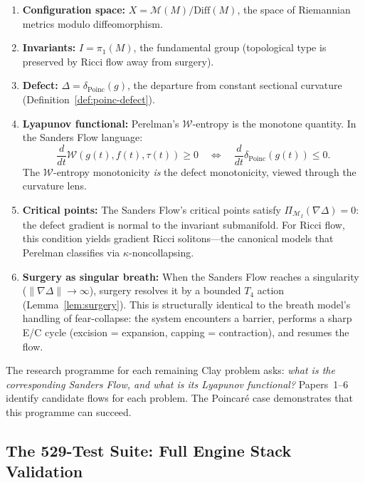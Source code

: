 \documentclass[11pt]{article}
\begin{document}
\begin{enumerate}
\item \textbf{Configuration space:} $X = \mathcal{M}(M)/\mathrm{Diff}(M)$,
the space of Riemannian metrics modulo diffeomorphism.

\item \textbf{Invariants:} $I = \pi_1(M)$, the fundamental group (topological
type is preserved by Ricci flow away from surgery).

\item \textbf{Defect:} $\Delta = \delta_{\mathrm{Poinc}}(g)$, the departure
from constant sectional curvature (Definition~\ref{def:poinc-defect}).

\item \textbf{Lyapunov functional:} Perelman's $\mathcal{W}$-entropy is the
monotone quantity.  In the Sanders Flow language:
\[
\frac{d}{dt}\mathcal{W}(g(t), f(t), \tau(t)) \geq 0
\quad\Longleftrightarrow\quad
\frac{d}{dt}\delta_{\mathrm{Poinc}}(g(t)) \leq 0.
\]
The $\mathcal{W}$-entropy monotonicity \emph{is} the defect monotonicity,
viewed through the curvature lens.

\item \textbf{Critical points:} The Sanders Flow's critical points satisfy
$\Pi_{\mathcal{M}_I}(\nabla\Delta) = 0$: the defect gradient is normal to
the invariant submanifold.  For Ricci flow, this condition yields gradient
Ricci solitons---the canonical models that Perelman classifies via
$\kappa$-noncollapsing.

\item \textbf{Surgery as singular breath:} When the Sanders Flow reaches
a singularity ($\|\nabla\Delta\| \to \infty$), surgery resolves it by
a bounded $T_4$ action (Lemma~\ref{lem:surgery}).  This is structurally
identical to the breath model's handling of fear-collapse: the system
encounters a barrier, performs a sharp E/C cycle (excision = expansion,
capping = contraction), and resumes the flow.
\end{enumerate}

\noindent
The research programme for each remaining Clay problem asks: \emph{what is
the corresponding Sanders Flow, and what is its Lyapunov functional?}
Papers~1--6 identify candidate flows for each problem.  The Poincar\'e
case demonstrates that this programme can succeed.

\subsection{The 529-Test Suite: Full Engine Stack Validation}
\label{subsec:529-tests}
\end{document}
